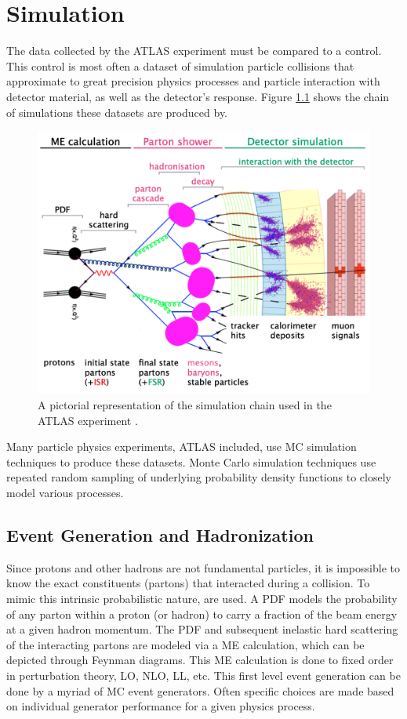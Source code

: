 \chapter{Simulation}\label{chap:sim}
	The data collected by the \gls{ATLAS} experiment must be compared to a control. This control is most often a dataset of simulation particle collisions that approximate to great precision physics processes and particle interaction with detector material, as well as the detector's response. Figure \ref{fig:simulation} shows the chain of simulations these datasets are produced by. 
	\begin{figure}[!ht]
	\centering
	\includegraphics[width=.95\textwidth,keepaspectratio=true]{chapters/chapter4_simulation/images/Simulation_Chain.png}
	\caption{\label{fig:simulation} A pictorial representation of the simulation chain used in the \gls{ATLAS} experiment \cite{Wanotayaroj:2242196}.}
	\end{figure}
	
	Many particle physics experiments, \gls{ATLAS} included, use \gls{MC} simulation techniques to produce these datasets. Monte Carlo simulation techniques use repeated random sampling of underlying probability density functions to closely model various processes. 

	\section{Event Generation and Hadronization}\label{sec:event-gen}
		Since protons and other hadrons are not fundamental particles, it is impossible to know the exact constituents (partons) that interacted during a collision. To mimic this intrinsic probabilistic nature,  are used. A \gls{PDF} models the probability of any parton within a proton (or hadron) to carry a fraction of the beam energy at a given hadron momentum. The \gls{PDF} and subsequent inelastic hard scattering of the interacting partons are modeled via a \gls{ME} calculation, which can be depicted through Feynman diagrams. This \gls{ME} calculation is done to fixed order in perturbation theory, \gls{LO}, \gls{NLO}, \gls{LL}, etc. This first level event generation can be done by a myriad of \gls{MC} event generators. Often specific choices are made based on individual generator performance for a given physics process.

